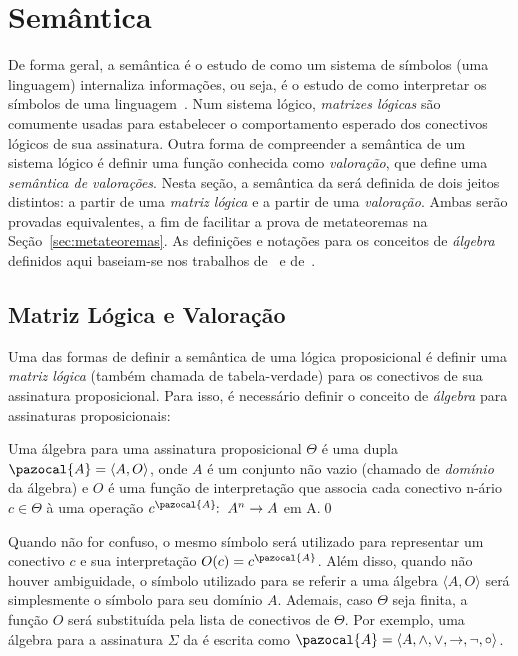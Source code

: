 \section{Semântica}\label{sec:semantica}
    De forma geral, a semântica é o estudo de como um sistema de símbolos (uma linguagem) internaliza informações, ou seja, é o estudo de como interpretar os símbolos de uma linguagem~\cite{brown2005encyclopedia}. Num sistema lógico, \textit{matrizes lógicas} são comumente usadas para estabelecer o comportamento esperado dos conectivos lógicos de sua assinatura. Outra forma de compreender a semântica de um sistema lógico é definir uma função conhecida como \textit{valoração}, que define uma \textit{semântica de valorações}. Nesta seção, a semântica da \lfium{} será definida de dois jeitos distintos: a partir de uma \textit{matriz lógica} e a partir de uma \textit{valoração}. Ambas serão provadas equivalentes, a fim de facilitar a prova de metateoremas na Seção~\ref{sec:metateoremas}. As definições e notações para os conceitos de \textit{álgebra} definidos aqui baseiam-se nos trabalhos de~ e de~.
    \subsection{Matriz Lógica e Valoração}
        Uma das formas de definir a semântica de uma lógica proposicional é definir uma \textit{matriz lógica} (também chamada de tabela-verdade) para os conectivos de sua assinatura proposicional. Para isso, é necessário definir o conceito de \textit{álgebra} para assinaturas proposicionais:
         

        \begin{definicao}\label{def:algebra}
            Uma álgebra para uma assinatura proposicional $\Theta$ é uma dupla $\pazocal{A} = \langle A, O \rangle$, onde $A$ é um conjunto não vazio (chamado de \textit{domínio} da álgebra) e $O$ é uma função de interpretação que associa cada conectivo n-ário $c \in \Theta$ à uma operação $c^{\pazocal{A}}\!\! : \; A^{n} \to A$ em A.\qed{}
        \end{definicao}

        Quando não for confuso, o mesmo símbolo será utilizado para representar um conectivo $c$ e sua interpretação $O(c) = c^{\pazocal{A}}$. Além disso, quando não houver ambiguidade, o símbolo utilizado para se referir a uma álgebra $\langle A, O \rangle$ será simplesmente o símbolo para seu domínio $A$. Ademais, caso $\Theta$ seja finita, a função $O$ será substituída pela lista de conectivos de $\Theta$. Por exemplo, uma álgebra para a assinatura $\Sigma$ da \lfium{} é escrita como $\pazocal{A} = \langle A,\land, \lor, \to, \neg, \circ \rangle$.

